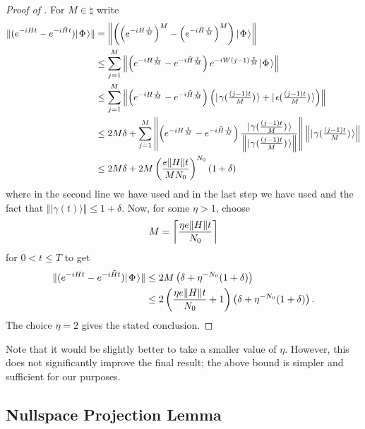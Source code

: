 \documentclass[../thesis-main/thesis-main]{subfiles}
\begin{document}
\begin{proof}[Proof of {}]
For $M \in \natural$ write
\begin{align*}
  \|{(e^{-iHt}-e^{-i\tilde{H}t}) |\mspace{2mu} \Phi \mspace{2mu} \rangle}\|
  &= \left\|{\left(\left(e^{-iH\frac{t}{M}}\right)^{M} -
     \left(e^{-i\tilde{H}\frac{t}{M}}\right)^{M}\right) |\mspace{2mu} \Phi \mspace{2mu} \rangle}\right\| \\
  & \leq \sum_{j=1}^{M} \left\|{\left(e^{-iH\frac{t}{M}} - 
     e^{-i\tilde{H}\frac{t}{M}}\right) e^{-iW\left(j-1\right)\frac{t}{M}}
     |\mspace{2mu} \Phi \mspace{2mu} \rangle}\right\| \\
  & \leq \sum_{j=1}^{M} 
    \left\|{\left(e^{-iH\frac{t}{M}} - e^{-i\tilde{H}\frac{t}{M}}\right)
    \left(|\mspace{2mu} \gamma(\tfrac{(j-1)t}{M}) \mspace{2mu} \rangle +
          |\mspace{2mu} \epsilon(\tfrac{(j-1)t}{M}) \mspace{2mu} \rangle\right)}\right\| \\
  & \leq 2M\delta+\sum_{j=1}^{M} 
    \left\|{ \left(e^{-iH\frac{t}{M}} - e^{-i\tilde{H}\frac{t}{M}}\right)
    \frac{|\mspace{2mu} \gamma(\tfrac{(j-1)t}{M}) \mspace{2mu} \rangle} 
         {\left\|{|\mspace{2mu} \gamma(\tfrac{(j-1)t}{M}) \mspace{2mu} \rangle}\right\|}}\right\|
    \left\|{|\mspace{2mu} \gamma(\tfrac{(j-1)t}{M}) \mspace{2mu} \rangle}\right\|\\ 
  & \leq 2M\delta 
    + 2M\left(\frac{e\|{H}\|t}{M N_0}\right)^{N_0}(1+\delta)
\end{align*}
where in the second line we have used  and in the last step we have used  and the fact that $\Vert |\gamma(t)\rangle\Vert \leq 1+\delta$.
Now, for some $\eta>1$, choose
\[
  M= \left\lceil \frac{\eta e\|{H}\|t}{N_0} \right\rceil
\]
for $0<t\leq T$ to get
\begin{align*}
  \|{(e^{-iHt}-e^{-i\tilde{H}t}) |\mspace{2mu} \Phi \mspace{2mu} \rangle}\|
  &\leq 2M\left(\delta + \eta^{-N_0}(1+\delta)\right) \\
  &\leq 2\left(\frac{\eta e\|{H}\|t}{N_0} + 1 \right) 
        \left(\delta + \eta^{-N_0}(1+\delta)\right).
\end{align*}
The choice $\eta=2$ gives the stated conclusion.
\end{proof}

Note that it would be slightly better to take a smaller value of $\eta$.  However, this does not significantly improve the final result; the above bound is simpler and sufficient for our purposes.

\subsection{Nullspace Projection Lemma}
\end{document}
